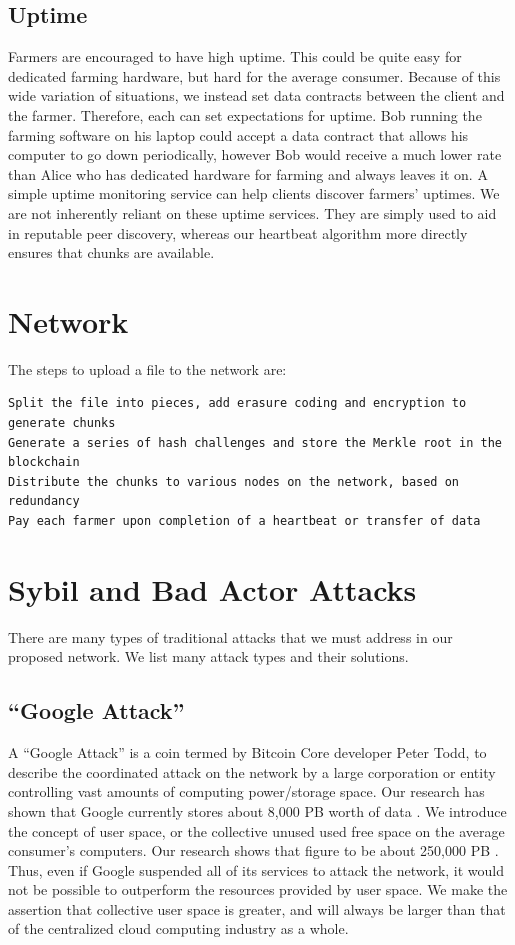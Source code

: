 \documentclass[a4paper,10pt]{article}
\begin{document}
\subsection{Uptime}
Farmers are encouraged to have high uptime. This could be quite easy for dedicated farming hardware, but hard for the average consumer. Because of this wide variation of situations, we instead set data contracts between the client and the farmer. Therefore, each can set expectations for uptime. Bob running the farming software on his laptop could accept a data contract that allows his computer to go down periodically, however Bob would receive a much lower rate than Alice who has dedicated hardware for farming and always leaves it on. A simple uptime monitoring service can help clients discover farmers’ uptimes. We are not inherently reliant on these uptime services. They are simply used to aid in reputable peer discovery, whereas our heartbeat algorithm more directly ensures that chunks are available. 

\section{Network}
The steps to upload a file to the network are:
\begin{lstlisting}
Split the file into pieces, add erasure coding and encryption to generate chunks
Generate a series of hash challenges and store the Merkle root in the blockchain
Distribute the chunks to various nodes on the network, based on redundancy
Pay each farmer upon completion of a heartbeat or transfer of data
\end{lstlisting}

\section{Sybil and Bad Actor Attacks}
There are many types of traditional attacks that we must address in our proposed network. We list many attack types and their solutions. 
\subsection{``Google Attack''}
A “Google Attack” is a coin termed by Bitcoin Core developer Peter Todd, to describe the coordinated attack on the network by a large corporation or entity controlling vast amounts of computing power/storage space. Our research has shown that Google currently stores about 8,000 PB worth of data \cite{15}. We introduce the concept of user space, or the collective unused used free space on the average consumer’s computers. Our research shows that figure to be about 250,000 PB \cite{15}. Thus, even if Google suspended all of its services to attack the network, it would not be possible to outperform the resources provided by user space. We make the assertion that collective user space is greater, and will always be larger than that of the centralized cloud computing industry as a whole.
\end{document}
